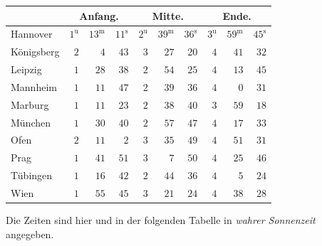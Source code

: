 \begin{center}\small\setlength{\tabcolsep}{3pt}
\begin{tabular}{l|rrr|rrr|rrr}
  &  \multicolumn{3}{c|}{Anfang.}  &  \multicolumn{3}{c|}{Mitte.}  &  \multicolumn{3}{c}{Ende.}  \\
\hline
 Hannover  &  $1^{\mathrm u}$  &  $13^{\mathrm m}$  &  $11^{\mathrm s}$  &  $2^{\mathrm u}$  &  $39^{\mathrm m}$  &  $36^{\mathrm s}$  &  $3^{\mathrm u}$  &  $59^{\mathrm m}$  &  $45^{\mathrm s}$ \\
 Königsberg  &  $2$  &  $4$  &  $43$  &  $3$  &  $27$  &  $20$  &  $4$  &  $41$  &  $32$ \\
 Leipzig  &  $1$  &  $28$  &  $38$  &  $2$  &  $54$  &  $25$  &  $4$  &  $13$  &  $45$ \\
 Mannheim  &  $1$  &  $11$  &  $47$  &  $2$  &  $39$  &  $36$  &  $4$  &  $0$  &  $31$ \\
 Marburg  &  $1$  &  $11$  &  $23$  &  $2$  &  $38$  &  $40$  &  $3$  &  $59$  &  $18$ \\
 München  &  $1$  &  $30$  &  $40$  &  $2$  &  $57$  &  $47$  &  $4$  &  $17$  &  $33$ \\
 Ofen  &  $2$  &  $11$  &  $2$  &  $3$  &  $35$  &  $49$  &  $4$  &  $51$  &  $31$ \\
 Prag  &  $1$  &  $41$  &  $51$  &  $3$  &  $7$  &  $50$  &  $4$  &  $25$  &  $46$ \\
 Tübingen  &  $1$  &  $16$  &  $42$  &  $2$  &  $44$  &  $36$  &  $4$  &  $5$  &  $24$ \\
 Wien  &  $1$  &  $55$  &  $45$  &  $3$  &  $21$  &  $24$  &  $4$  &  $38$  &  $28$ \\
\end{tabular}
\end{center}

Die Zeiten sind hier und in der folgenden Tabelle in \emph{wahrer Sonnenzeit} angegeben.


